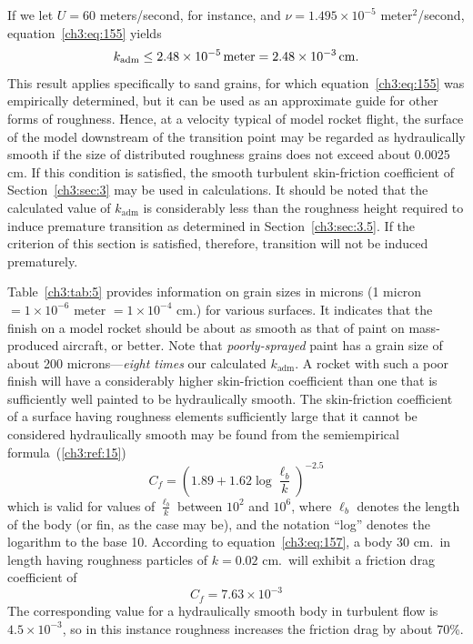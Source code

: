 If we let $U = 60$ meters/second, for instance, and $\nu = 1.495 \times 10^{-5}$
meter$^{2}$/second, equation~\eqref{ch3:eq:155} yields
\begin{equation*}
k_{\mathrm{adm}} \le 2.48 \times 10^{-5}\,\mathrm{meter} = 2.48 \times 10^{-3}\,\mathrm{cm.}
\end{equation*}
This result applies specifically to sand grains, for which equation~\eqref{ch3:eq:155} was
empirically determined, but it can be used as an approximate guide for other forms of roughness.
Hence, at a velocity typical of model rocket flight, the surface of the model downstream of the
transition point may be regarded as hydraulically smooth if the size of distributed roughness
grains does not exceed about 0.0025 cm. If this condition is satisfied, the smooth turbulent
skin-friction coefficient of Section~\ref{ch3:sec:3} may be used in calculations. It should be
noted that the calculated value of $k_{\mathrm{adm}}$ is considerably less than the roughness height
required to induce premature transition as determined in Section~\ref{ch3:sec:3.5}. If the
criterion of this section is satisfied, therefore, transition will not be induced prematurely.

Table~\ref{ch3:tab:5} provides information on grain sizes in microns (1 micron
$= 1 \times 10^{-6}$ meter $= 1 \times 10^{-4}$ cm.) for various surfaces. It indicates that the
finish on a model rocket should be about as smooth as that of paint on mass-produced aircraft, or
better. Note that \emph{poorly-sprayed} paint has a grain size of about 200 microns---\emph{eight
times} our calculated $k_{\mathrm{adm}}$. A rocket with such a poor finish will have a considerably
higher skin-friction coefficient than one that is sufficiently well painted to be hydraulically
smooth. The skin-friction coefficient of a surface having roughness elements sufficiently large
that it cannot be considered hydraulically smooth may be found from the semiempirical
formula~(\ref{ch3:ref:15})
\begin{equation}\label{ch3:eq:157}
C_f = \left(1.89 + 1.62\log\frac{\ell_b}{k}\right)^{-2.5}
\end{equation}
which is valid for values of $\frac{\ell_b}{k}$ between $10^{2}$ and $10^{6}$, where $\ell_b$
denotes the length of the body (or fin, as the case may be), and the notation ``log'' denotes the
logarithm to the base 10. According to equation~\eqref{ch3:eq:157}, a body 30 cm.\ in length
having roughness particles of $k = 0.02$ cm.\ will exhibit a friction drag coefficient of
\begin{equation*}
C_f = 7.63 \times 10^{-3}
\end{equation*}
The corresponding value for a hydraulically smooth body in turbulent flow is $4.5 \times 10^{-3}$,
so in this instance roughness increases the friction drag by about 70\%.

